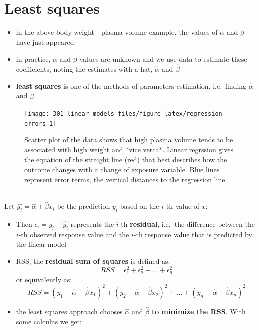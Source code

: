 \documentclass[
]{book}
\providecommand{\tightlist}{%
  \setlength{\itemsep}{0pt}\setlength{\parskip}{0pt}}
\theoremstyle{definition}
\theoremstyle{definition}
\theoremstyle{definition}
\theoremstyle{remark}
\begin{document}
\hypertarget{least-squares}{%
\section{Least squares}\label{least-squares}}

\begin{itemize}
\tightlist
\item
  in the above body weight - plasma volume example, the values of \(\alpha\) and \(\beta\) have just appeared
\item
  in practice, \(\alpha\) and \(\beta\) values are unknown and we use data to estimate these coefficients, noting the estimates with a hat, \(\hat{\alpha}\) and \(\hat{\beta}\)
\item
  \textbf{least squares} is one of the methods of parameters estimation, i.e.~finding \(\hat{\alpha}\) and \(\hat{\beta}\)
\end{itemize}

\begin{figure}

{\centering \texttt{[image: 301-linear-models\_files/figure-latex/regression-errors-1]} 

}

\caption{Scatter plot of the data shows that high plasma volume tends to be associated with high weight and *vice verca*. Linear regrssion gives the equation of the straight line (red) that best describes how the outcome changes with a change of exposure variable. Blue lines represent error terms, the vertical distances to the regression line}\label{fig:regression-errors}
\end{figure}

~\\
Let \(\hat{y_i}=\hat{\alpha} + \hat{\beta}x_i\) be the prediction \(y_i\) based on the \(i\)-th value of \(x\):

\begin{itemize}
\tightlist
\item
  Then \(\epsilon_i = y_i - \hat{y_i}\) represents the \(i\)-th \textbf{residual}, i.e.~the difference between the \(i\)-th observed response value and the \(i\)-th response value that is predicted by the linear model
\item
  RSS, the \textbf{residual sum of squares} is defined as: \[RSS = \epsilon_1^2 + \epsilon_2^2 + \dots + \epsilon_n^2\] or
  equivalently as: \[RSS=(y_1-\hat{\alpha}-\hat{\beta}x_1)^2+(y_2-\hat{\alpha}-\hat{\beta}x_2)^2+...+(y_n-\hat{\alpha}-\hat{\beta}x_n)^2\]
\item
  the least squares approach chooses \(\hat{\alpha}\) and \(\hat{\beta}\) \textbf{to minimize the RSS}. With some calculus we get:
\end{itemize}
\end{document}
